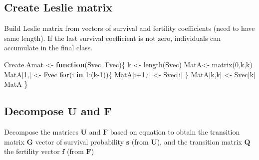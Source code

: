 \documentclass[
]{book}
\newenvironment{Shaded}{\begin{snugshade}}{\end{snugshade}}
\newcommand{\ControlFlowTok}[1]{\textcolor[rgb]{0.13,0.29,0.53}{\textbf{#1}}}
\newcommand{\DecValTok}[1]{\textcolor[rgb]{0.00,0.00,0.81}{#1}}
\newcommand{\FunctionTok}[1]{\textcolor[rgb]{0.00,0.00,0.00}{#1}}
\newcommand{\NormalTok}[1]{#1}
\newcommand{\OtherTok}[1]{\textcolor[rgb]{0.56,0.35,0.01}{#1}}
\newcommand{\SpecialCharTok}[1]{\textcolor[rgb]{0.00,0.00,0.00}{#1}}
\begin{document}
\hypertarget{create-leslie-matrix}{%
\subsection{Create Leslie matrix}\label{create-leslie-matrix}}

Build Leslie matrix from vectors of survival and fertility coefficients (need to have same length). If the last survival coefficient is not zero, individuals can accumulate in the final class.

\begin{Shaded}
\begin{Highlighting}[]
\NormalTok{Create.Amat }\OtherTok{\textless{}{-}} \ControlFlowTok{function}\NormalTok{(Svec, Fvec)\{}
\NormalTok{  k }\OtherTok{\textless{}{-}} \FunctionTok{length}\NormalTok{(Svec)}
\NormalTok{  MatA}\OtherTok{\textless{}{-}} \FunctionTok{matrix}\NormalTok{(}\DecValTok{0}\NormalTok{,k,k)}
\NormalTok{  MatA[}\DecValTok{1}\NormalTok{,] }\OtherTok{\textless{}{-}}\NormalTok{ Fvec }
  \ControlFlowTok{for}\NormalTok{(i }\ControlFlowTok{in} \DecValTok{1}\SpecialCharTok{:}\NormalTok{(k}\DecValTok{{-}1}\NormalTok{))\{}
\NormalTok{    MatA[i}\SpecialCharTok{+}\DecValTok{1}\NormalTok{,i] }\OtherTok{\textless{}{-}}\NormalTok{ Svec[i]}
\NormalTok{  \}}
\NormalTok{  MatA[k,k] }\OtherTok{\textless{}{-}}\NormalTok{ Svec[k] }
\NormalTok{  MatA}
\NormalTok{  \}}
\end{Highlighting}
\end{Shaded}

\hypertarget{decompose-mathbfu-and-mathbff}{%
\subsection{\texorpdfstring{Decompose \(\mathbf{U}\) and \(\mathbf{F}\)}{Decompose \textbackslash mathbf\{U\} and \textbackslash mathbf\{F\}}}\label{decompose-mathbfu-and-mathbff}}

Decompose the matrices \(\mathbf{U}\) and \(\mathbf{F}\) based on equation to obtain the transition matrix \(\mathbf{G}\) vector of survival probability \(\mathbf{s}\) (from \(\mathbf{U}\)), and the transition matrix \(\mathbf{Q}\) the fertility vector \(\mathbf{f}\) (from \(\mathbf{F}\))
\end{document}

